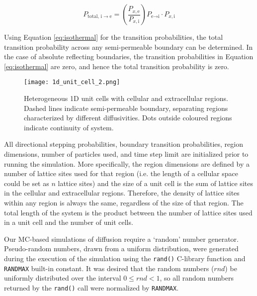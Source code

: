 	\begin{equation}
		\label{eq:total_transition_prob}
		P_{\textrm{total},\, \textrm{i} \rightarrow \textrm{e}} = \left( \dfrac{P_{x,\textrm{e}}}{P_{x,\textrm{i}}}\right)  P_{\textrm{e}\rightarrow \textrm{i}} \cdot P_{x,\textrm{i}}
	\end{equation}
	
	Using Equation \ref{eq:isothermal} for the transition probabilities, the total transition probability across any semi-permeable boundary can be determined. In the case of absolute reflecting boundaries, the transition probabilities in Equation \ref{eq:isothermal} are zero, and hence the total transition probability is zero.
	
	\begin{figure}[h]
		\centering
		\texttt{[image: 1d\_unit\_cell\_2.png]}
		\caption[Heterogeneous 1D cell model]{Heterogeneous 1D unit cells with cellular and extracellular regions. Dashed lines indicate semi-permeable boundary, separating regions characterized by different diffusivities. Dots outside coloured regions indicate continuity of system.}
		\label{fig:1d_unit_cell_2.png}
	\end{figure}
	
	\newpage
	All directional stepping probabilities, boundary transition probabilities, region dimensions, number of particles used, and time step limit are initialized prior to running the simulation. More specifically, the region dimensions are defined by a number of lattice sites used for that region (i.e. the length of a cellular space could be set as $ n $ lattice sites) and the size of a unit cell is the sum of lattice sites in the cellular and extracellular regions. Therefore, the density of lattice sites within any region is always the same, regardless of the size of that region. The total length of the system is the product between the number of lattice sites used in a unit cell and the number of unit cells.
	 	
	Our MC-based simulations of diffusion require a `random' number generator. Pseudo-random numbers, drawn from a uniform distribution, were generated during the execution of the simulation using the \texttt{rand()} C-library function and \texttt{RAND\textunderscore MAX} built-in constant. It was desired that the random numbers ($ rnd $) be uniformly distributed over the interval $ 0 \leq rnd < 1 $, so all random numbers returned by the \texttt{rand()} call were normalized by \texttt{RAND\textunderscore MAX}.
	
